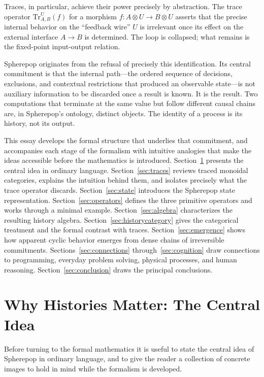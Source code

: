 \documentclass[12pt]{article}
\begin{document}
Traces, in particular, achieve their power precisely by abstraction. The trace operator $\mathrm{Tr}^U_{A,B}(f)$ for a morphism $f : A \otimes U \to B \otimes U$ asserts that the precise internal behavior on the ``feedback wire'' $U$ is irrelevant once its effect on the external interface $A \to B$ is determined. The loop is collapsed; what remains is the fixed-point input-output relation.

Spherepop originates from the refusal of precisely this identification. Its central commitment is that the internal path---the ordered sequence of decisions, exclusions, and contextual restrictions that produced an observable state---is not auxiliary information to be discarded once a result is known. It is the result. Two computations that terminate at the same value but follow different causal chains are, in Spherepop's ontology, distinct objects. The identity of a process is its history, not its output.

This essay develops the formal structure that underlies that commitment, and accompanies each stage of the formalism with intuitive analogies that make the ideas accessible before the mathematics is introduced. Section~\ref{sec:intuition} presents the central idea in ordinary language. Section~\ref{sec:traces} reviews traced monoidal categories, explains the intuition behind them, and isolates precisely what the trace operator discards. Section~\ref{sec:state} introduces the Spherepop state representation. Section~\ref{sec:operators} defines the three primitive operators and works through a minimal example. Section~\ref{sec:algebra} characterizes the resulting history algebra. Section~\ref{sec:historycategory} gives the categorical treatment and the formal contrast with traces. Section~\ref{sec:emergence} shows how apparent cyclic behavior emerges from dense chains of irreversible commitments. Sections~\ref{sec:connections} through~\ref{sec:cognition} draw connections to programming, everyday problem solving, physical processes, and human reasoning. Section~\ref{sec:conclusion} draws the principal conclusions.

\section{Why Histories Matter: The Central Idea}
\label{sec:intuition}

Before turning to the formal mathematics it is useful to state the central idea of Spherepop in ordinary language, and to give the reader a collection of concrete images to hold in mind while the formalism is developed.
\end{document}
